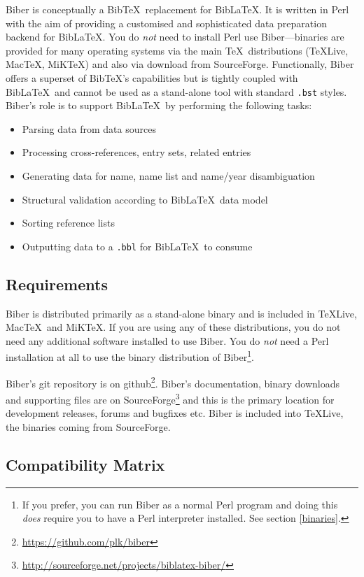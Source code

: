 \documentclass{ltxdockit}
\begin{document}
Biber is conceptually a Bib\TeX\ replacement for
Bib\LaTeX. It is written in Perl with the aim of providing a
customised and sophisticated data preparation backend for Bib\LaTeX.
You do \emph{not} need to install Perl use Biber---binaries
are provided for many operating systems via the main \TeX\
distributions (\TeX Live, Mac\TeX, MiK\TeX) and also via download from SourceForge.
Functionally, Biber offers a superset of Bib\TeX's capabilities but is
tightly coupled with Bib\LaTeX\ and cannot be used as a stand-alone tool
with standard \verb+.bst+ styles. Biber's role is to support
Bib\LaTeX\ by performing the following tasks:

\begin{itemize}
\item Parsing data from data sources
\item Processing cross-references, entry sets, related entries
\item Generating data for name, name list and name/year disambiguation
\item Structural validation according to Bib\LaTeX\ data model
\item Sorting reference lists
\item Outputting data to a \verb+.bbl+ for Bib\LaTeX\ to consume
\end{itemize}

\subsection{Requirements}\label{ref:req}

Biber is distributed primarily as a stand-alone binary and is
included in \TeX Live, Mac\TeX\ and MiK\TeX. If you are using any of these
distributions, you do not need any additional software installed to use
Biber. You do \emph{not} need a Perl installation at all to use
the binary distribution of Biber\footnote{If you prefer, you can run
Biber as a normal Perl program and doing this \emph{does} require
you to have a Perl interpreter installed. See section \ref{binaries}.}.

Biber's git repository is on
github\footnote{\url{https://github.com/plk/biber}}. Biber's documentation,
binary downloads and supporting files are on
SourceForge\footnote{\url{http://sourceforge.net/projects/biblatex-biber/}}
and this is the primary location for development releases, forums and
bugfixes etc. Biber is included into \TeX Live, the binaries coming from
SourceForge.

\subsection{Compatibility Matrix}
\end{document}

